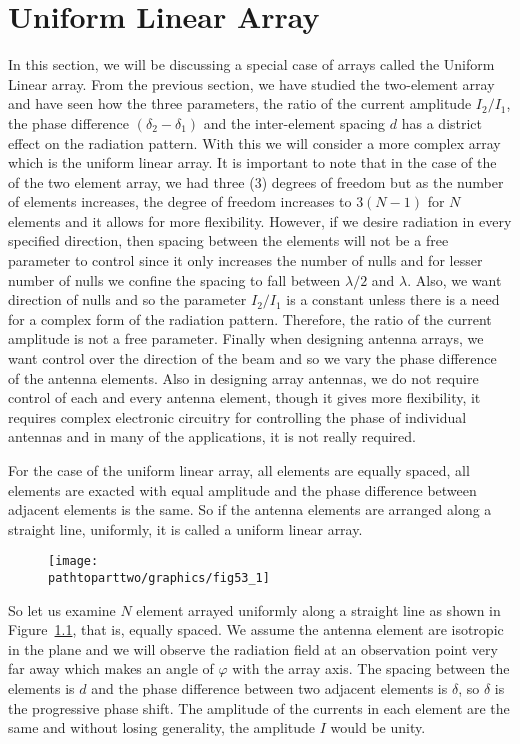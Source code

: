 \chapter{Uniform Linear Array}
In this section, we will be discussing a special case of arrays called the Uniform Linear array. From the previous section, we have studied the two-element array and have seen how the three parameters, the ratio of the current amplitude $I_{2} / I_{1}$, the phase difference $\left(\delta_2 - \delta_1\right)$ and the inter-element spacing $d$ has a district effect on the radiation pattern. With this we will consider a more complex array which is the uniform linear array. It is important to note that in the case of the of the two element array, we had three (3) degrees of freedom but as the number of elements increases, the degree of freedom increases to $3(N -1)$ for $N$ elements and it allows for more flexibility. However, if we desire radiation in every specified direction, then spacing between the elements will not be a free parameter to control since it only increases the number of nulls and for lesser number of nulls we confine the spacing to fall between $\lambda/2$ and $\lambda$. Also, we want direction of nulls and so the parameter $I_{2} / I_{1}$ is a constant unless there is a need for a complex form of the radiation pattern. Therefore, the ratio of the current amplitude is not a free parameter. Finally when designing antenna arrays, we want control over the direction of the beam and so we vary the phase difference of the antenna elements. Also in designing array antennas, we do not require control of each and every antenna element, though it gives more flexibility, it requires complex electronic circuitry for controlling the phase of individual antennas and in many of the applications, it is not really required.

For the case of the uniform linear array, all elements are equally spaced, all elements are exacted with equal amplitude and the phase difference between adjacent elements is the same. So if the antenna elements are arranged along a straight line, uniformly, it is called a uniform linear array.
\begin{figure}[h]
\centering
\texttt{[image: \\pathtoparttwo/graphics/fig53\_1]}
\caption{}
\label{53.1}
\end{figure}

So let us examine $N$ element arrayed uniformly along a straight line as shown in Figure~\ref{53.1}, that is, equally spaced. We assume the antenna element are isotropic in the plane and we will observe the radiation field at an observation point very far away which makes an angle of $\varphi$ with the array axis. The spacing between the elements is $d$ and the phase difference between two adjacent elements is $\delta$, so $\delta$ is the progressive phase shift. The amplitude of the currents in each element are the same and without losing generality, the amplitude $I$ would be unity.

